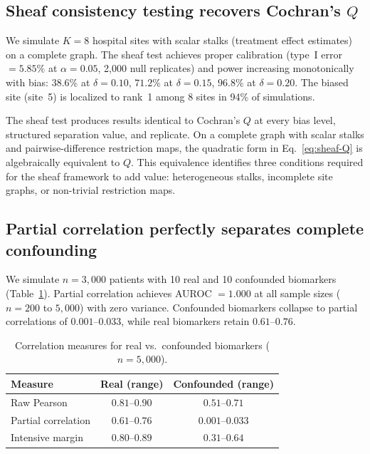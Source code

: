 \documentclass[11pt]{article}
\begin{document}
\subsection{Sheaf consistency testing recovers Cochran's $Q$}
\label{sec:res-sheaf}

We simulate $K = 8$ hospital sites with scalar stalks (treatment effect estimates) on a complete graph.
The sheaf test achieves proper calibration (type~I error $= 5.85\%$ at $\alpha = 0.05$, 2{,}000 null replicates) and power increasing monotonically with bias: $38.6\%$ at $\delta = 0.10$, $71.2\%$ at $\delta = 0.15$, $96.8\%$ at $\delta = 0.20$.
The biased site (site~5) is localized to rank~1 among 8 sites in 94\% of simulations.

The sheaf test produces results identical to Cochran's $Q$ at every bias level, structured separation value, and replicate.
On a complete graph with scalar stalks and pairwise-difference restriction maps, the quadratic form in Eq.~\eqref{eq:sheaf-Q} is algebraically equivalent to $Q$.
This equivalence identifies three conditions required for the sheaf framework to add value: heterogeneous stalks, incomplete site graphs, or non-trivial restriction maps.

\subsection{Partial correlation perfectly separates complete confounding}
\label{sec:res-confound}

We simulate $n = 3{,}000$ patients with 10 real and 10 confounded biomarkers (Table~\ref{tab:confound}).
Partial correlation achieves AUROC $= 1.000$ at all sample sizes ($n = 200$ to $5{,}000$) with zero variance.
Confounded biomarkers collapse to partial correlations of $0.001$--$0.033$, while real biomarkers retain $0.61$--$0.76$.

\begin{table}[t]
\centering
\caption{Correlation measures for real vs.\ confounded biomarkers ($n = 5{,}000$).}
\label{tab:confound}
\small
\begin{tabular}{@{}lcc@{}}
\toprule
\textbf{Measure} & \textbf{Real (range)} & \textbf{Confounded (range)} \\
\midrule
Raw Pearson & $0.81$--$0.90$ & $0.51$--$0.71$ \\
Partial correlation & $0.61$--$0.76$ & $0.001$--$0.033$ \\
Intensive margin & $0.80$--$0.89$ & $0.31$--$0.64$ \\
\bottomrule
\end{tabular}
\end{table}
\end{document}
